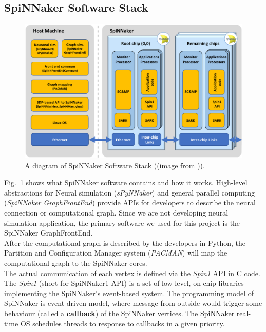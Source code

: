 \subsection{SpiNNaker Software Stack } \label{sec:sss}
    \begin{figure}[!tb]
        \centering
       \includegraphics[width=1\textwidth]{figures/software_stack.png}
       \caption{A diagram of SpiNNaker Software Stack ((image from \cite{spin-chip-resources})).}
       \label{fig:software_stack}
    \end{figure}

Fig.~\ref{fig:software_stack} shows what SpiNNaker software \cite{software_spinn} contains and how it works. High-level abstractions for Neural simulation (\textit{sPyNNaker}) and general parallel computing (\textit{SpiNNaker GraphFrontEnd}) provide APIs for developers to describe the neural connection or computational graph. Since we are not developing neural simulation application, the primary software we used for this project is the SpiNNaker GraphFrontEnd. \\

After the computational graph is described by the developers in Python, the Partition and Configuration Manager system (\textit{PACMAN}) will map the computational graph to the SpiNNaker cores. \\

The actual communication of each vertex is defined via the \textit{Spin1} API in C code. The \textit{Spin1} (short for SpiNNaker1 API) is a set of low-level, on-chip libraries implementing the SpiNNaker's event-based system. The programming model of SpiNNaker is event-driven model, where message from outside would trigger some behaviour (called a \textbf{callback}) of the SpiNNaker vertices. The SpiNNaker real-time OS schedules threads to response to callbacks in a given priority.\\

